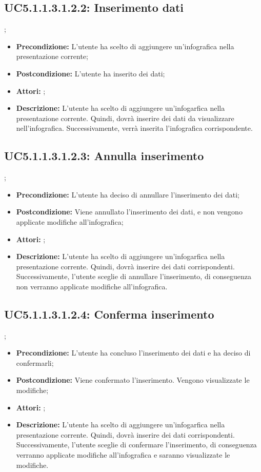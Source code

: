 \subsection{ UC5.1.1.3.1.2.2: Inserimento dati}
;
\begin{itemize}
	\item \textbf{Precondizione:} L'utente ha scelto di aggiungere un'infografica nella presentazione corrente;
	\item \textbf{Postcondizione:} L'utente ha inserito dei dati;
	\item \textbf{Attori:} ;
	\item \textbf{Descrizione:} L'utente ha scelto di aggiungere un'infogarfica nella presentazione corrente. Quindi, dovrà inserire dei dati da visualizzare nell'infografica. Successivamente, verrà inserita l'infografica corrispondente.
\end{itemize}
\subsection{ UC5.1.1.3.1.2.3: Annulla inserimento}
;
\begin{itemize}
	\item \textbf{Precondizione:} L'utente ha deciso di annullare l'inserimento dei dati;
	\item \textbf{Postcondizione:} Viene annullato l'inserimento dei dati, e non vengono applicate modifiche all'infografica;
	\item \textbf{Attori:} ;
	\item \textbf{Descrizione:} L'utente ha scelto di aggiungere un'infogarfica nella presentazione corrente. Quindi, dovrà inserire dei dati corrispondenti. Successivamente, l'utente sceglie di annullare l'inserimento, di conseguenza non verranno applicate modifiche all'infografica.
\end{itemize}
\subsection{ UC5.1.1.3.1.2.4: Conferma inserimento}
;
\begin{itemize}
	\item \textbf{Precondizione:} L'utente ha concluso l'inserimento dei dati e ha deciso di confermarli;
	\item \textbf{Postcondizione:} Viene confermato l'inserimento. Vengono visualizzate le modifiche;
	\item \textbf{Attori:} ;
	\item \textbf{Descrizione:} L'utente ha scelto di aggiungere un'infogarfica nella presentazione corrente. Quindi, dovrà inserire dei dati corrispondenti. Successivamente, l'utente sceglie di confermare l'inserimento, di conseguenza verranno applicate modifiche all'infografica e saranno visualizzate le modifiche.
\end{itemize}
